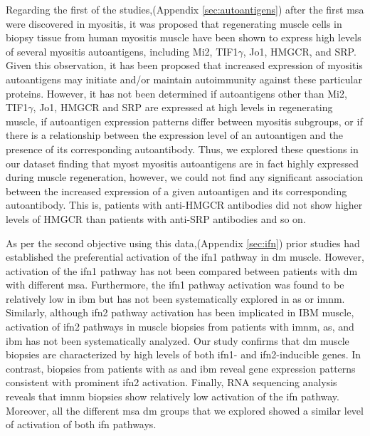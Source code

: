 Regarding the first of the studies,(Appendix \autoref{sec:autoantigens}) after the first \gls{msa} were discovered in myositis, it was proposed that regenerating muscle cells in biopsy tissue from human myositis muscle have been shown to express high levels of several myositis autoantigens, including Mi2, TIF1$\gamma$, Jo1, HMGCR, and SRP.\cite{Mohassel2015,Mammen2009,CasciolaRosen2005,Allenbach2018} Given this observation, it has been proposed that increased expression of myositis autoantigens may initiate and/or maintain autoimmunity against these particular proteins. However, it has not been determined if autoantigens other than Mi2, TIF1$\gamma$, Jo1, HMGCR and SRP are expressed at high levels in regenerating muscle, if autoantigen expression patterns differ between myositis subgroups, or if there is a relationship between the expression level of an autoantigen and the presence of its corresponding autoantibody. Thus, we explored these questions in our dataset finding that myost myositis autoantigens are in fact highly expressed during muscle regeneration, however, we could not find any significant association between the increased expression of a given autoantigen and its corresponding autoantibody. This is, patients with anti-HMGCR antibodies did not show higher levels of HMGCR than patients with anti-SRP antibodies and so on.

As per the second objective using this data,(Appendix \autoref{sec:ifn}) prior studies had established the preferential activation of the \gls{ifn}1 pathway in \gls{dm} muscle.\cite{Greenberg2005} However, activation of the \gls{ifn}1 pathway has not been compared between patients with \gls{dm} with different \gls{msa}. Furthermore, the \gls{ifn}1 pathway activation was found to be relatively low in \gls{ibm} but has not been systematically explored in \gls{as} or \gls{imnm}.\cite{Greenberg2005,Salajegheh2010,Greenberg2002} Similarly, although \gls{ifn}2 pathway activation has been implicated in IBM muscle,\cite{Ivanidze2011,Allenbach2014} activation of \gls{ifn}2 pathways in muscle biopsies from patients with \gls{imnm}, \gls{as}, and \gls{ibm} has not been systematically analyzed. Our study confirms that \gls{dm} muscle biopsies are characterized by high levels of both \gls{ifn}1- and \gls{ifn}2-inducible genes. In contrast, biopsies from patients with \gls{as} and \gls{ibm} reveal gene expression patterns consistent with prominent \gls{ifn}2 activation. Finally, RNA sequencing analysis reveals that \gls{imnm} biopsies show relatively low activation of the \gls{ifn} pathway. Moreover, all the different \gls{msa} \gls{dm} groups that we explored showed a similar level of activation of both \gls{ifn} pathways.

